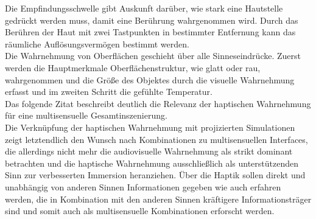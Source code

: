 Die Empfindungsschwelle gibt Auskunft darüber, wie stark eine Hautstelle gedrückt werden muss, damit eine Berührung wahrgenommen wird. Durch das Berühren der Haut mit zwei Tastpunkten in bestimmter Entfernung kann das räumliche Auflösungsvermögen bestimmt werden. \cite[Vgl. Seite 28]{Sprenger.2020}\\
Die Wahrnehmung von Oberflächen geschieht über alle Sinneseindrücke. Zuerst werden die Hauptmerkmale Oberflächenstruktur, wie glatt oder rau, wahrgenommen und die Größe des Objektes durch die visuelle Wahrnehmung erfasst und im zweiten Schritt die gefühlte Temperatur. \cite[Vgl. Seite 33]{Sprenger.2020}\\
Das folgende Zitat beschreibt deutlich die Relevanz der haptischen Wahrnehmung für eine multisensuelle Gesamtinszenierung. \\
\glqq Die Verknüpfung der haptischen Wahrnehmung mit projizierten Simulationen zeigt letztendlich den Wunsch nach Kombinationen zu multisensuellen Interfaces, die allerdings nicht mehr die audiovisuelle Wahrnehmung als strikt dominant betrachten und die haptische Wahrnehmung ausschließlich als unterstützenden Sinn zur verbesserten Immersion heranziehen. Über die Haptik sollen direkt und unabhängig von anderen Sinnen Informationen gegeben wie auch erfahren werden, die in Kombination mit den anderen Sinnen kräftigere Informationsträger sind und somit auch als multisensuelle Kombinationen erforscht werden. \grqq{} \cite[Seite 263]{Sprenger.2020}
